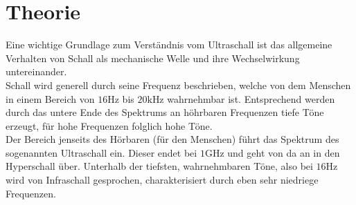 \section{Theorie}
Eine wichtige Grundlage zum Verständnis vom Ultraschall ist das allgemeine Verhalten von Schall als mechanische Welle 
und ihre Wechselwirkung untereinander. \\ 
Schall wird generell durch seine Frequenz beschrieben, welche von dem Menschen in einem Bereich von $16 \si{\hertz}$ bis $20 \si{\kilo\hertz}$
wahrnehmbar ist. Entsprechend werden durch das untere Ende des Spektrums an höhrbaren Frequenzen tiefe Töne erzeugt,
für hohe Frequenzen folglich hohe Töne. \\
Der Bereich jenseits des Hörbaren (für den Menschen) führt das Spektrum des sogenannten Ultraschall ein. Dieser endet bei 
$1 \si{\giga\hertz} $ und geht von da an in den Hyperschall über. Unterhalb der tiefsten, wahrnehmbaren Töne, also bei $16 \si{\hertz}$
wird von Infraschall gesprochen, charakterisiert durch eben sehr niedriege Frequenzen.

